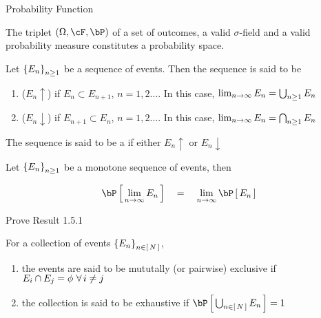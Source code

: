 \documentclass{article}
\begin{document}
\begin{ssection}{Probability Function}
	\begin{definition}
		The triplet $\para{\Omega, \cF, \bP}$ of a set of outcomes, a valid $\sigma$-field and a valid probability measure constitutes a probability space.
		\label{def:prob_space}
	\end{definition}

	\begin{definition}
		Let $\left\{ {E_n} \right\}_{n \ge 1}$ be a sequence of events. Then the sequence is said to be

		\begin{enumerate}[label=(\roman*)]
			\item ($E_n \uparrow$)  if $E_n \subset E_{n + 1}$, $n = 1, 2 \dots$. In this case, $\lim_{n \rightarrow \infty} E_n = \bigcup_{n \ge 1} E_n$
			\item ($E_n \downarrow$)  if $E_{n + 1} \subset E_n$, $n = 1, 2 \dots$. In this case, $\lim_{n \rightarrow \infty} E_n = \bigcap_{n \ge 1} E_n$
		\end{enumerate}

		The sequence is said to be a  if either $E_n \uparrow$ or $E_n \downarrow$
		\label{def:cont_prob_func}
	\end{definition}

	\begin{result}
		Let $\left\{ {E_n} \right\}_{n \ge 1}$ be a monotone sequence of events, then

		\begin{align*}
			\prob{\lim_{n \ra \infty} E_n}	\eq	\lim_{n \ra \infty} \prob{E_n}
		\end{align*}
	\end{result}

	\begin{exercise}
		Prove Result 1.5.1
	\end{exercise}

	\begin{definition}
		For a collection of events $\left\{ {E_n} \right\}_{n \in \left[\,{N}\,\right]}$,
		\begin{enumerate}[label=(\roman*)]
			\item the events are said to be mututally (or pairwise) exclusive if $E_i \cap E_j = \phi \,\,\forall\, i \ne j$
			\item the collection is said to be exhaustive if $\prob{\bigcup_{n \in \brac{N}} E_n} = 1$
		\end{enumerate}
		\label{def:props_of_collection_of_events}
	\end{definition}

\end{ssection}
\end{document}
